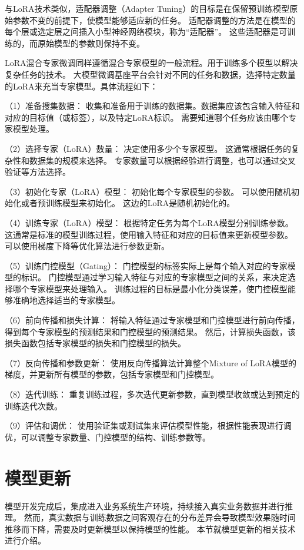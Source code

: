 与LoRA技术类似，适配器调整（Adapter Tuning）的目标是在保留预训练模型原始参数不变的前提下，使模型能够适应新的任务。
适配器调整的方法是在模型的每个层或选定层之间插入小型神经网络模块，称为“适配器”。
这些适配器是可训练的，而原始模型的参数则保持不变。

LoRA混合专家微调同样遵循混合专家模型的一般流程。用于训练多个模型以解决复杂任务的技术。
大模型微调基座平台会针对不同的任务和数据，选择特定数量的LoRA来充当专家模型。具体流程如下：

（1）准备搜集数据：
收集和准备用于训练的数据集。数据集应该包含输入特征和对应的目标值（或标签），以及特定LoRA标识。
需要知道哪个任务应该由哪个专家模型处理。

（2）选择专家（LoRA）数量：
决定使用多少个专家模型。
这通常根据任务的复杂性和数据集的规模来选择。
专家数量可以根据经验进行调整，也可以通过交叉验证等方法选择。

（3）初始化专家（LoRA）模型：
初始化每个专家模型的参数。
可以使用随机初始化或者预训练模型来初始化。
这边的LoRA是随机初始化的。

（4）训练专家（LoRA）模型：
根据特定任务为每个LoRA模型分别训练参数。
这通常是标准的模型训练过程，使用输入特征和对应的目标值来更新模型参数。
可以使用梯度下降等优化算法进行参数更新。

（5）训练门控模型（Gating）：
门控模型的标签实际上是每个输入对应的专家模型的标识。
门控模型通过学习输入特征与对应的专家模型之间的关系，来决定选择哪个专家模型来处理输入。
训练过程的目标是最小化分类误差，使门控模型能够准确地选择适当的专家模型。

（6）前向传播和损失计算：
将输入特征通过专家模型和门控模型进行前向传播，得到每个专家模型的预测结果和门控模型的预测结果。
然后，计算损失函数，该损失函数包括专家模型的损失和门控模型的损失。

（7）反向传播和参数更新：
使用反向传播算法计算整个Mixture of LoRA模型的梯度，并更新所有模型的参数，包括专家模型和门控模型。

（8）迭代训练：
重复训练过程，多次迭代更新参数，直到模型收敛或达到预定的训练迭代次数。

（9）评估和调优：
使用验证集或测试集来评估模型性能，根据性能表现进行调优，可以调整专家数量、门控模型的结构、训练参数等。


\section{模型更新}

模型开发完成后，集成进入业务系统生产环境，持续接入真实业务数据并进行推理。
然而，真实数据与训练数据之间客观存在的分布差异会导致模型效果随时间推移而下降，需要及时更新模型以保持模型的性能。
本节就模型更新的相关技术进行介绍。

